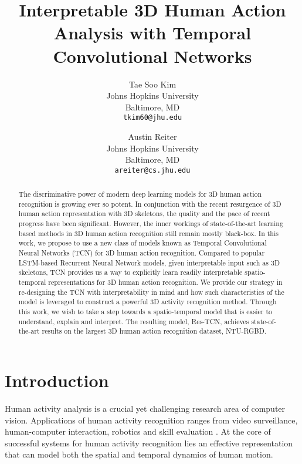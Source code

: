 \documentclass[10pt,twocolumn,letterpaper]{article}
\begin{document}
\title{Interpretable 3D Human Action Analysis with Temporal Convolutional Networks }

\author{Tae Soo Kim\\
Johns Hopkins University\\
Baltimore, MD\\
{\tt\small tkim60@jhu.edu}
\and
Austin Reiter\\
Johns Hopkins University\\
Baltimore, MD\\
{\tt\small areiter@cs.jhu.edu}
}

\maketitle


\begin{abstract}
   The discriminative power of modern deep learning models for 3D human action recognition is growing ever so potent. In conjunction with the recent resurgence of 3D human action representation with 3D skeletons, the quality and the pace of recent progress have been significant. However, the inner workings of state-of-the-art learning based methods in 3D human action recognition still remain mostly black-box. In this work, we propose to use a new class of models known as Temporal Convolutional Neural Networks (TCN) for 3D human action recognition. Compared to popular LSTM-based Recurrent Neural Network models, given interpretable input such as 3D skeletons, TCN provides us a way to explicitly learn readily interpretable spatio-temporal representations for 3D human action recognition. We provide our strategy in re-designing the TCN with interpretability in mind and how such characteristics of the model is leveraged to construct a powerful 3D activity recognition method. Through this work, we wish to take a step towards a spatio-temporal model that is easier to understand, explain and interpret. The resulting model, Res-TCN, achieves state-of-the-art results on the largest 3D human action recognition dataset, NTU-RGBD.
\end{abstract}


\section{Introduction}

Human activity analysis is a crucial yet challenging research area of computer vision. Applications of human activity recognition ranges from video surveillance, human-computer interaction, robotics and skill evaluation \cite{survey2014,survey2011}. At the core of successful systems for human activity recognition lies an effective representation that can model both the spatial and temporal dynamics of human motion. 
\end{document}

